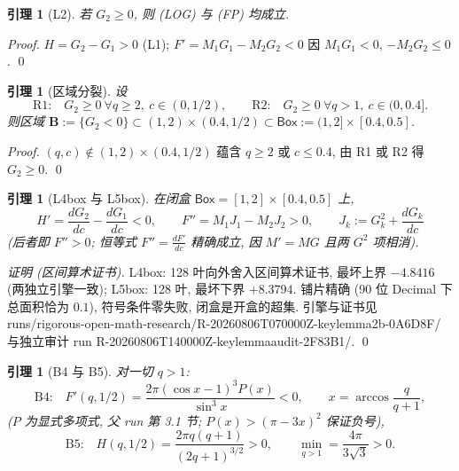 \documentclass[UTF8]{ctexart}
\newtheorem{lemma}[theorem]{引理}
\begin{document}
\begin{lemma}[L2]
若 $G_2\ge0$, 则 (LOG) 与 (FP) 均成立.
\end{lemma}
\begin{proof}
$H=G_2-G_1>0$ (L1); $F'=M_1G_1-M_2G_2<0$ 因 $M_1G_1<0$, $-M_2G_2\le0$. \qed
\end{proof}

\begin{lemma}[区域分裂]
设
\begin{equation}
	\text{R1:}\quad G_2\ge0\ \forall q\ge2,\ c\in(0,1/2),
	\qquad
	\text{R2:}\quad G_2\ge0\ \forall q>1,\ c\in(0,0.4].
\end{equation}
则区域 $\mathbf B:=\{G_2<0\}\subset(1,2)\times(0.4,1/2)\subset
\mathsf{Box}:=(1,2]\times[0.4,0.5]$.
\end{lemma}
\begin{proof}
$(q,c)\notin(1,2)\times(0.4,1/2)$ 蕴含 $q\ge2$ 或 $c\le0.4$, 由 R1 或 R2 得 $G_2\ge0$. \qed
\end{proof}

\begin{lemma}[L4box 与 L5box]
\label{lem:box}
在闭盒 $\mathsf{Box}=[1,2]\times[0.4,0.5]$ 上,
\begin{equation}
	H'=\frac{dG_2}{dc}-\frac{dG_1}{dc}<0,\qquad
	F''=M_1J_1-M_2J_2>0,\qquad J_k:=G_k^2+\frac{dG_k}{dc}
\end{equation}
(后者即 $F''>0$; 恒等式 $F''=\frac{dF'}{dc}$ 精确成立, 因 $M'=MG$ 且两 $G^2$ 项相消).
\end{lemma}
\begin{proof}[证明 (区间算术证书)]
L4box: 128 叶向外舍入区间算术证书, 最坏上界 $-4.8416$ (两独立引擎一致);
L5box: 128 叶, 最坏下界 $+8.3794$. 铺片精确 (90 位 Decimal 下总面积恰为 $0.1$),
符号条件零失败, 闭盒是开盒的超集. 引擎与证书见
runs/\allowbreak rigorous-open-math-research/\allowbreak R-20260806T070000Z-keylemma2b-0A6D8F/
与独立审计 run R-20260806T140000Z-keylemmaaudit-2F83B1/. \qed
\end{proof}

\begin{lemma}[B4 与 B5]
\label{lem:b45}
对一切 $q>1$:
\begin{equation}
	\text{B4:}\quad F'(q,1/2)=\frac{2\pi(\cos x-1)^3P(x)}{\sin^3x}<0,\qquad
	x=\arccos\frac q{q+1},
\end{equation}
($P$ 为显式多项式, 父 run 第 3.1 节; $P(x)>(\pi-3x)^2$ 保证负号),
\begin{equation}
	\text{B5:}\quad H(q,1/2)=\frac{2\pi q(q+1)}{(2q+1)^{3/2}}>0,\qquad
	\min_{q>1}=\frac{4\pi}{3\sqrt3}>0.
\end{equation}
\end{lemma}
\end{document}
